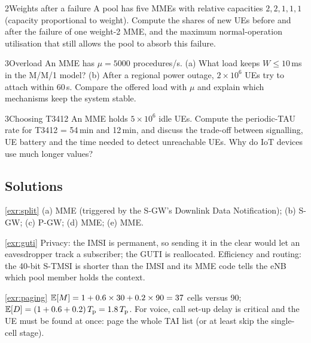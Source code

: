 \documentclass[11pt,a4paper]{article}
\begin{document}
\begin{exercisebox}{2}{Weights after a failure}\label{exr:weights}
A pool has five MMEs with relative capacities $2,2,1,1,1$ (capacity proportional to weight). Compute the
shares of new UEs before and after the failure of one weight-2 MME, and the maximum normal-operation
utilisation that still allows the pool to absorb this failure.
\end{exercisebox}

\begin{exercisebox}{3}{Overload}\label{exr:overload}
An MME has $\mu = 5000$ procedures/s. (a) What load keeps $W \le 10$\,ms in the M/M/1 model? (b) After a
regional power outage, $2\times10^6$ UEs try to attach within 60\,s. Compare the offered load with $\mu$ and
explain which mechanisms keep the system stable.
\end{exercisebox}

\begin{exercisebox}{3}{Choosing T3412}\label{exr:t3412}
An MME holds $5\times10^6$ idle UEs. Compute the periodic-TAU rate for T3412 = 54\,min and 12\,min, and discuss
the trade-off between signalling, UE battery and the time needed to detect unreachable UEs. Why do IoT
devices use much longer values?
\end{exercisebox}

\subsection*{Solutions}

\begin{solutionbox}{\ref{exr:split}}
(a) MME (triggered by the S-GW's Downlink Data Notification); (b) S-GW; (c) P-GW; (d) MME; (e) MME.
\end{solutionbox}

\begin{solutionbox}{\ref{exr:guti}}
Privacy: the IMSI is permanent, so sending it in the clear would let an eavesdropper track a subscriber;
the GUTI is reallocated. Efficiency and routing: the 40-bit S-TMSI is shorter than the IMSI and its MME code
tells the eNB which pool member holds the context.
\end{solutionbox}

\begin{solutionbox}{\ref{exr:paging}}
$\mathbb{E}[M] = 1 + 0.6\times30 + 0.2\times90 = 37$ cells versus 90; $\mathbb{E}[D] = (1 + 0.6 + 0.2)\,T_\mathrm{p} = 1.8\,T_\mathrm{p}$. For
voice, call set-up delay is critical and the UE must be found at once: page the whole TAI list (or at least
skip the single-cell stage).
\end{solutionbox}
\end{document}

